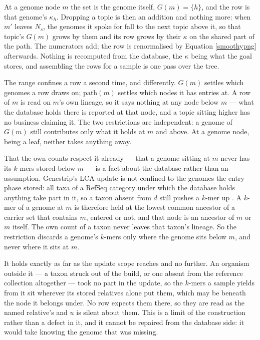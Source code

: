 \documentclass[pdflatex,sn-vancouver-num]{sn-jnl}
\begin{document}
    At a genome node $m$ the set is the genome itself, $G(m) = \{h\}$, and the row is that
    genome's $\kappa_h$. Dropping a topic is then an addition and nothing more: when $m'$ leaves $N_s$,
    the genomes it spoke for fall to the next topic above it, so that topic's $G(m)$ grows by
    them and its row grows by their $\kappa$ on the shared part of the path. The numerators add; the
    row is renormalised by Equation \eqref{smoothypng} afterwards. Nothing is recomputed from the
    database, the $\kappa$ being what the goal stores, and assembling the rows for a sample is one
    pass over the tree.

    The range confines a row a second time, and differently. $G(m)$ settles which genomes a row
    draws on; $\mathrm{path}(m)$ settles which nodes it has entries at. A row of $m$ is read on $m$'s
    own lineage, so it says nothing at any node below $m$ --- what the database holds there is
    reported at that node, and a topic sitting higher has no business claiming it. The two
    restrictions are independent: a genome of $G(m)$ still contributes only what it holds at $m$
    and above. At a genome node, being a leaf, neither takes anything away.

    That the own counts respect it already --- that a genome sitting at $m$ never has its $k$-mers
    stored below $m$ --- is a fact about the database rather than an assumption.
    Genestrip's LCA update is not confined to the genomes the entry phase stored:
    all taxa of a RefSeq category under which the database holds anything take part in it, so a taxon
    absent from $d$ still pushes a $k$-mer up \citep{genestrip-pub}. A $k$-mer of a genome at $m$ is
    therefore held at the lowest common ancestor of a carrier set that contains $m$, entered or not,
    and that node is an ancestor of $m$ or $m$ itself. The own count of a taxon never leaves that
    taxon's lineage. So the restriction discards a genome's $k$-mers only where the genome sits below $m$, and never
    where it sits at $m$.

    It holds exactly as far as the update scope reaches and no further. An organism outside it ---
    a taxon struck out of the build, or one absent from the reference collection altogether --- took
    no part in the update, so the $k$-mers a sample yields from it sit wherever its stored relatives
    alone put them, which may be beneath the node it belongs under. No row expects them there, so
    they are read as the named relative's and $u$ is silent about them. This is a limit of the construction rather than a defect in it, and it cannot be repaired from the database side: it
    would take knowing the genome that was missing.
\end{document}
